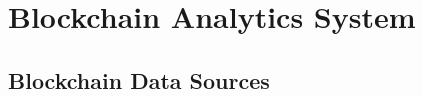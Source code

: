 \documentclass[USenglish]{uit-thesis}
\newcommand{\definition}[1]{%
  \refstepcounter{definition}%
  \par\noindent\textbf{The Definition~\thedefinition. #1}%
  \addcontentsline{def}{definition}
    {\protect\numberline{\thechapter.\thedefinition}#1}\par%
}
\begin{document}









\chapter{Blockchain Analytics System}
\label{chap:expsetup}

\section{Blockchain Data Sources}
\label{sec:apis}



\end{document}
